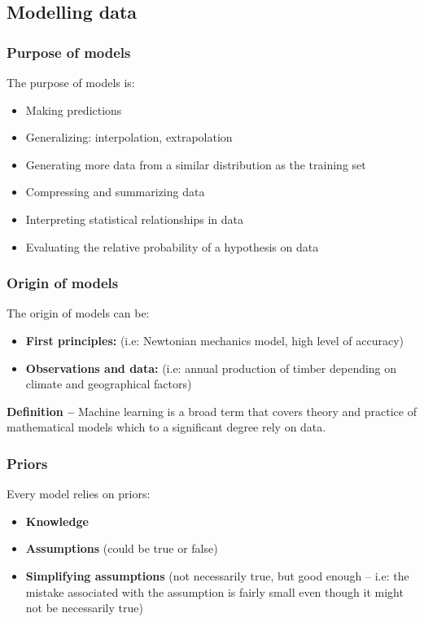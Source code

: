 \documentclass[a4paper,11pt]{article}
\begin{document}
	\subsection{Modelling data}
	\subsubsection{Purpose of models}
	The purpose of models is:
	\begin{itemize}
		\item Making predictions
		\item Generalizing: interpolation, extrapolation
		\item Generating more data from a similar distribution as the training set
		\item Compressing and summarizing data
		\item Interpreting statistical relationships in data
		\item Evaluating the relative probability of a hypothesis on data
	\end{itemize}
	\subsubsection{Origin of models}
	The origin of models can be:
	\begin{itemize}
		\item \textbf{First principles:}  (i.e: Newtonian mechanics model, high level of accuracy)
		\item \textbf{Observations and data:} (i.e: annual production of timber depending on climate and geographical factors)
	\end{itemize}
	\textbf{Definition --} Machine learning is a broad term that covers theory and practice of mathematical models which to a significant degree rely on data.
	\subsubsection{Priors}
	Every model relies on priors: 
	\begin{itemize}
		\item \textbf{Knowledge}
		\item \textbf{Assumptions} (could be true or false)
		\item \textbf{Simplifying assumptions} (not necessarily true, but good enough -- i.e:  the mistake associated with the assumption is fairly small even though it might not be necessarily true)
	\end{itemize}
\end{document}

